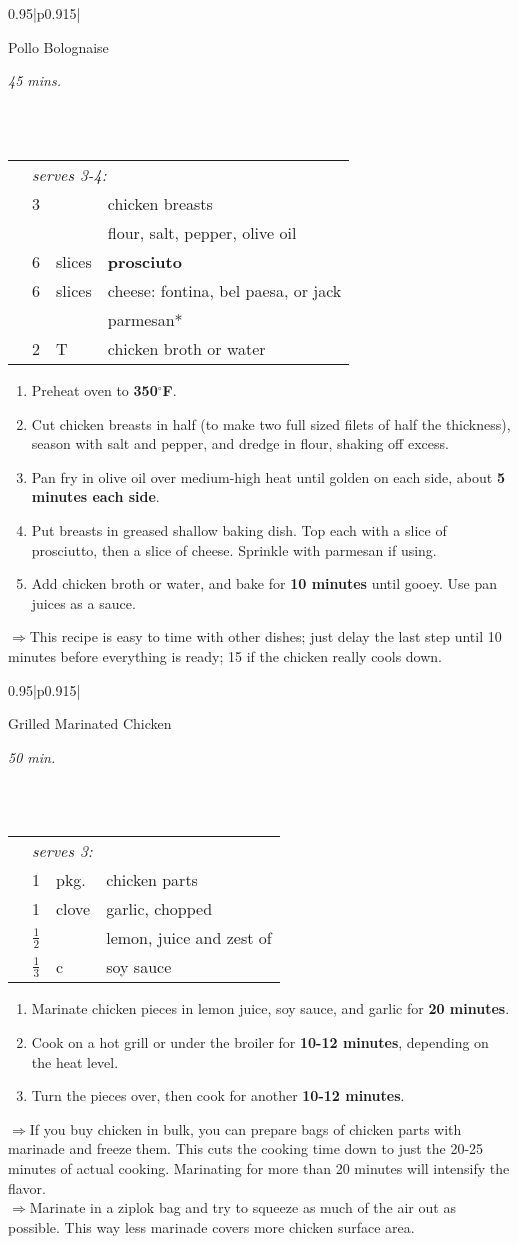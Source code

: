 \documentclass[8pt]{report}
\newcommand{\ingredmargin}{0.25cm}
\newcommand{\F}{$^\circ$F}
\newenvironment{recipe}[3]
  {\bigskip \bigskip 
\begin{tabular*}{0.95\textwidth}{|p{0.915\textwidth}|} \hline \vspace{0.25mm}
\begin{minipage}{0.7\textwidth}	\begin{flushleft} {\Large \textsf{#1}} \end{flushleft} \end{minipage}
\begin{minipage}{0.2\textwidth} \begin{flushright} \emph{#2} \end{flushright} \end{minipage} \\ \\ \hline
\begin{ingreds}{#3} \addcontentsline{toc}{section}{#1} \phantomsection \label{rec:#1}} 
  {\\ \hline \end{tabular*} \noindent}
\newenvironment{ingreds}[1]
  {\begin{tabular}{lrlp{0.6\textwidth}} \hspace{\ingredmargin} & \multicolumn{3}{l}{\it #1:} \\}
  {\end{tabular} \medskip}
\newcommand{\ingredsdone}{\end{ingreds}\begin{enumerate}}
\newcommand{\stepsdone}{\end{enumerate} \medskip}
\newcommand{\ingredient}[3]{\hspace{\ingredmargin} & #1 & #2 & #3 \\}
\newcommand{\tip}{$\Rightarrow$}
\begin{document}
\begin{recipe}{Pollo Bolognaise}{45 mins.}{serves 3-4}
\index{pollo bolognaise} \index{bolognaise!pollo bolognaise}
\index{chicken!pollo bolognaise}
\ingredient{3}{}{chicken breasts}
\ingredient{}{}{flour, salt, pepper, olive oil}
\ingredient{6}{slices}{\bf prosciuto}
\ingredient{6}{slices}{cheese: fontina, bel paesa, or jack}
\ingredient{}{}{parmesan*}
\ingredient{2}{T}{chicken broth or water}
\ingredsdone
\item Preheat oven to {\bf 350\F}.
\item Cut chicken breasts in half (to make two full sized filets of half the thickness), season with salt and pepper, and dredge in flour, shaking off excess.
\item Pan fry in olive oil over medium-high heat until golden on each side, about {\bf 5 minutes each side}.
\item Put breasts in greased shallow baking dish.  Top each with a slice of prosciutto, then a slice of cheese.  Sprinkle with parmesan if using.
\item Add chicken broth or water, and bake for {\bf 10 minutes} until gooey.  Use pan juices as a sauce.
\stepsdone
\noindent \tip This recipe is easy to time with other dishes; just delay the last step until 10 minutes before everything is ready; 15 if the chicken really cools down.  
\end{recipe}


\begin{recipe}{Grilled Marinated Chicken}{50 min.}{serves 3}
\index{chicken!grilled, w/ginger and paprika}
\ingredient{1}{pkg.}{chicken parts}
\ingredient{1}{clove}{garlic, chopped}
\ingredient{$\frac12$}{}{lemon, juice and zest of}
\ingredient{$\frac13$}{c}{soy sauce}
\ingredsdone
\item Marinate chicken pieces in lemon juice, soy sauce, and garlic for {\bf 20 minutes}.
\item Cook on a hot grill or under the broiler for {\bf 10-12 minutes}, depending on the heat level.  
\item Turn the pieces over, then cook for another {\bf 10-12 minutes}.
\stepsdone
\noindent \tip If you buy chicken in bulk, you can prepare bags of chicken parts with marinade and freeze them.  This cuts the cooking time down to just the 20-25 minutes of actual cooking.  Marinating for more than 20 minutes will intensify the flavor.\\
\tip Marinate in a ziplok bag and try to squeeze as much of the air out as possible.  This way less marinade covers more chicken surface area.
\end{recipe}
\newpage
\end{document}
